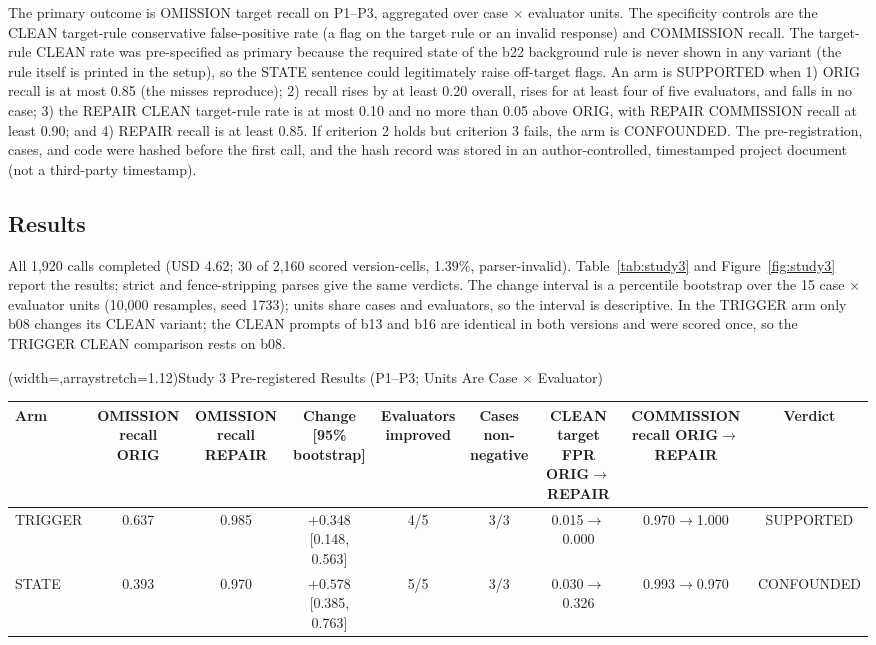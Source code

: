 \documentclass{ieeeaccess}
\newcommand{\thead}[1]{\shortstack[c]{#1}}
\begin{document}
The primary outcome is OMISSION target recall on P1--P3, aggregated over case $\times$ evaluator units. The specificity controls are the CLEAN target-rule conservative false-positive rate (a flag on the target rule or an invalid response) and COMMISSION recall. The target-rule CLEAN rate was pre-specified as primary because the required state of the b22 background rule is never shown in any variant (the rule itself is printed in the setup), so the STATE sentence could legitimately raise off-target flags. An arm is SUPPORTED when 1) ORIG recall is at most 0.85 (the misses reproduce); 2) recall rises by at least 0.20 overall, rises for at least four of five evaluators, and falls in no case; 3) the REPAIR CLEAN target-rule rate is at most 0.10 and no more than 0.05 above ORIG, with REPAIR COMMISSION recall at least 0.90; and 4) REPAIR recall is at least 0.85. If criterion 2 holds but criterion 3 fails, the arm is CONFOUNDED. The pre-registration, cases, and code were hashed before the first call, and the hash record was stored in an author-controlled, timestamped project document (not a third-party timestamp).

\subsection{Results}
All 1,920 calls completed (USD 4.62; 30 of 2,160 scored version-cells, 1.39\%, parser-invalid). Table~\ref{tab:study3} and Figure~\ref{fig:study3} report the results; strict and fence-stripping parses give the same verdicts. The change interval is a percentile bootstrap over the 15 case $\times$ evaluator units (10,000 resamples, seed 1733); units share cases and evaluators, so the interval is descriptive. In the TRIGGER arm only b08 changes its CLEAN variant; the CLEAN prompts of b13 and b16 are identical in both versions and were scored once, so the TRIGGER CLEAN comparison rests on b08.

\Table[t](width=\textwidth,arraystretch=1.12){Study 3 Pre-registered Results (P1--P3; Units Are Case $\times$ Evaluator) \label{tab:study3}}{\setlength{\tabcolsep}{4pt}\begin{tabular}{@{}lcccccccc@{}}
\toprule
Arm & \thead{OMISSION recall\\ORIG} & \thead{OMISSION recall\\REPAIR} & \thead{Change\\{[}95\% bootstrap{]}} & \thead{Evaluators\\improved} & \thead{Cases\\non-negative} & \thead{CLEAN target FPR\\ORIG$\rightarrow$REPAIR} & \thead{COMMISSION recall\\ORIG$\rightarrow$REPAIR} & Verdict\\
\midrule
TRIGGER & 0.637 & 0.985 & $+0.348$ [0.148, 0.563] & 4/5 & 3/3 & 0.015$\rightarrow$0.000 & 0.970$\rightarrow$1.000 & SUPPORTED\\
STATE & 0.393 & 0.970 & $+0.578$ [0.385, 0.763] & 5/5 & 3/3 & 0.030$\rightarrow$0.326 & 0.993$\rightarrow$0.970 & CONFOUNDED\\
\bottomrule
\end{tabular}}
\end{document}
